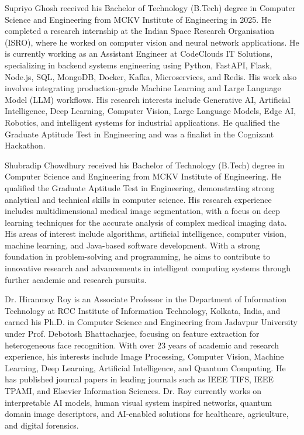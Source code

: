 {\sloppy Supriyo Ghosh received his Bachelor of Technology (B.Tech) degree in Computer Science and Engineering from MCKV Institute of Engineering in 2025. He completed a research internship at the Indian Space Research Organisation (ISRO), where he worked on computer vision and neural network applications. He is currently working as an Assistant Engineer at CodeClouds IT Solutions, specializing in backend systems engineering using Python, FastAPI, Flask, Node.js, SQL, MongoDB, Docker, Kafka, Microservices, and Redis. His work also involves integrating production-grade Machine Learning and Large Language Model (LLM) workflows. His research interests include Generative AI, Artificial Intelligence, Deep Learning, Computer Vision, Large Language Models, Edge AI, Robotics, and intelligent systems for industrial applications. He qualified the Graduate Aptitude Test in Engineering and was a finalist in the Cognizant Hackathon.\par}
\endbio

Shubradip Chowdhury received his Bachelor of Technology (B.Tech) degree in Computer Science and Engineering from MCKV Institute of Engineering. He qualified the Graduate Aptitude Test in Engineering, demonstrating strong analytical and technical skills in computer science. His research experience includes multidimensional medical image segmentation, with a focus on deep learning techniques for the accurate analysis of complex medical imaging data. His areas of interest include algorithms, artificial intelligence, computer vision, machine learning, and Java-based software development. With a strong foundation in problem-solving and programming, he aims to contribute to innovative research and advancements in intelligent computing systems through further academic and research pursuits.
\endbio

Dr. Hiranmoy Roy is an Associate Professor in the Department of Information Technology at RCC Institute of Information Technology, Kolkata, India, and earned his Ph.D. in Computer Science and Engineering from Jadavpur University under Prof. Debotosh Bhattacharjee, focusing on feature extraction for heterogeneous face recognition. With over 23 years of academic and research experience, his interests include Image Processing, Computer Vision, Machine Learning, Deep Learning, Artificial Intelligence, and Quantum Computing. He has published journal papers in leading journals such as IEEE TIFS, IEEE TPAMI, and Elsevier Information Sciences. Dr. Roy currently works on interpretable AI models, human visual system inspired networks, quantum domain image descriptors, and AI-enabled solutions for healthcare, agriculture, and digital forensics.
\endbio


